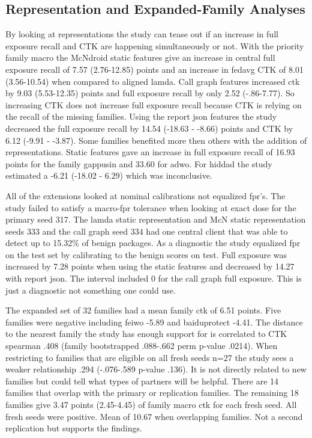 \documentclass[12pt,letterpaper]{article}
\begin{document}
\subsection*{Representation and Expanded-Family Analyses} 

By looking at representations the study can tease out if an increase in full exposure recall and CTK are happening simultaneously or not. With the priority family macro the McNdroid static features give an increase in central full exposure recall of 7.57 (2.76-12.85) points and an increase in fedavg CTK of 8.01 (3.56-10.54) when compared to aligned lamda. Call graph features increased ctk by 9.03 (5.53-12.35) points and full exposure recall by only 2.52 (-.86-7.77). So increasing CTK does not increase full exposure recall because CTK is relying on the recall of the missing families. Using the report json features the study decreased the full exposure recall by 14.54 (-18.63 - -8.66) points and CTK by 6.12 (-9.91 - -3.87). Some families benefited more then others with the addition of representations. Static features gave an increase in full exposure recall of 16.93 points for the family gappusin and 33.60 for adwo. For hiddad the study estimated a -6.21 (-18.02 - 6.29) which was inconclusive.

All of the extensions looked at nominal calibrations not equalized fpr's. The study failed to satisfy a macro-fpr tolerance when looking at exact dose for the primary seed 317. The lamda static representation and McN static representation seeds 333 and the call graph seed 334 had one central client that was able to detect up to 15.32\% of benign packages. As a diagnostic the study equalized fpr on the test set by calibrating to the benign scores on test. Full exposure was increased by 7.28 points when using the static features and decreased by 14.27 with report json. The interval included 0 for the call graph full exposure. This is just a diagnostic not something one could use.

The expanded set of 32 families had a mean family ctk of 6.51 points. Five families were negative including feiwo -5.89 and baiduprotect -4.41. The distance to the nearest family the study has enough support for is correlated to CTK spearman .408 (family bootstrapped .088-.662 perm p-value .0214). When restricting to families that are eligible on all fresh seeds n=27 the study sees a weaker relationship .294 (-.076-.589 p-value .136). It is not directly related to new families but could tell what types of partners will be helpful. There are 14 families that overlap with the primary or replication families. The remaining 18 families give 3.47 points (2.45-4.45) of family macro ctk for each fresh seed. All fresh seeds were positive. Mean of 10.67 when overlapping families. Not a second replication but supports the findings.
\end{document}
